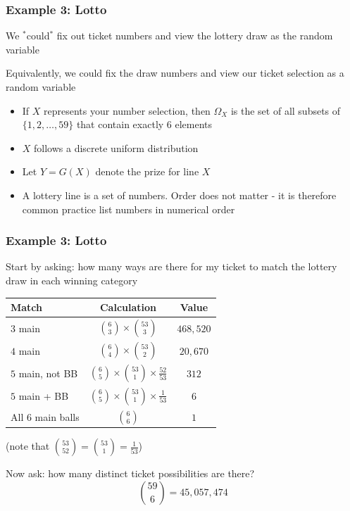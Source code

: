 \documentclass[t,8pt]{beamer}%
\begin{document}
\begin{frame}
\frametitle{Example 3: Lotto}
We $^*$could$^*$ fix out ticket numbers and view the lottery draw as the random variable \par
Equivalently, we could fix the draw numbers and view our ticket selection as a random variable
\begin{itemize}
    \item If $X$ represents your number selection, then $\Omega_X$ is the set of all subsets of $\{1,2,\dots,59\}$ that contain exactly $6$ elements
    \item $X$ follows a discrete uniform distribution
    \item Let $Y=G(X)$ denote the prize for line $X$
    \item A lottery line is a set of numbers. Order does not matter - it is therefore common practice list numbers in numerical order
\end{itemize}
\end{frame}

\begin{frame}
\frametitle{Example 3: Lotto}
Start by asking: how many ways are there for my ticket to match the lottery draw in each winning category
\begin{table}
\centering
\begin{tabular}{|l|c|c|}
    \hline 
    Match & Calculation & Value \\ \hline
    $3$ main & ${{6}\choose{3}}\times{{53}\choose{3}}$ & $468,520$ \\
    $4$ main & ${{6}\choose{4}}\times{{53}\choose{2}}$ & $20,670$ \\
    $5$ main, not BB & ${{6}\choose{5}}\times{{53}\choose{1}}\times\frac{52}{53}$ & $312$ \\
    $5$ main + BB & ${{6}\choose{5}}\times{{53}\choose{1}}\times\frac{1}{53}$ & $6$ \\
    All $6$ main balls & ${6\choose 6}$ & $1$ \\ \hline
    \end{tabular}
    \end{table}
(note that ${{53}\choose{52}}={{53}\choose{1}}=\frac 1{53}$) \par
Now ask: how many distinct ticket possibilities are there?
$${59\choose 6}=45,057,474$$
\end{frame}
\end{document}
